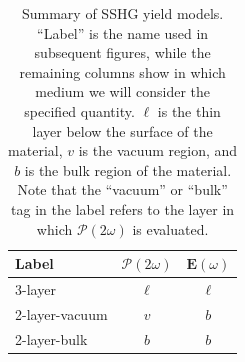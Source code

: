 \documentclass[prb,superscriptaddress,showpacs,twocolumn,letterpaper]{revtex4}
\begin{document}
\begin{table}[b]
\begin{ruledtabular}
\begin{tabular}{ l c c }
Label         &  $\boldsymbol{\mathcal{P}}(2\omega)$  &  $\mathbf{E}(\omega)$ \\
\hline
3-layer         &           $\ell$          &      $\ell$   \\
2-layer-vacuum  &            $v$            &        $b$    \\
2-layer-bulk    &            $b$            &        $b$    
\end{tabular}
\end{ruledtabular}
\caption{Summary of SSHG yield models. ``Label'' is the name used in subsequent
figures, while the remaining columns show in which medium we will consider the
specified quantity. $\ell$ is the thin layer below the surface of the material,
$v$ is the vacuum region, and $b$ is the bulk region of the material. Note that
the ``vacuum'' or ``bulk'' tag in the label refers to the layer in which
$\boldsymbol{\mathcal{P}}(2\omega)$  is evaluated.
\label{tab:models}}
\end{table}
\end{document}
